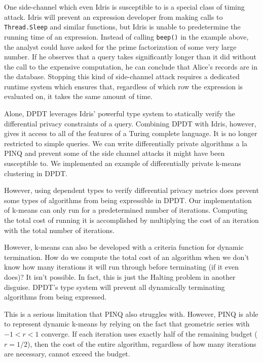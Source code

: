 \documentclass[12pt]{report}
\begin{document}
One side-channel which even Idris is susceptible to is a special class of timing attack.
Idris will prevent an expression developer from making calls to \texttt{Thread.Sleep} and similar functions, but Idris is unable to predetermine the running time of an expression.
Instead of calling \texttt{beep()} in the example above, the analyst could have asked for the prime factorization of some very large number.
If he observes that a query takes significantly longer than it did without the call to the expensive computation, he can conclude that Alice's records are in the database.
Stopping this kind of side-channel attack requires a dedicated runtime system which ensures that, regardless of which row the expression is evaluated on, it takes the same amount of time\cite{conf/uss/HaeberlenPN11}.

Alone, DPDT leverages Idris' powerful type system to statically verify the differential privacy constraints of a query.
Combining DPDT with Idris, however, gives it access to all of the features of a Turing complete language.
It is no longer restricted to simple queries.
We can write differentially private algorithms a la PINQ and prevent some of the side channel attacks it might have been susceptible to.
We implemented an example of differentially private k-means clustering in DPDT.

However, using dependent types to verify differential privacy metrics does prevent some types of algorithms from being expressible in DPDT.
Our implementation of k-means can only run for a predetermined number of iterations.
Computing the total cost of running it is accomplished by multiplying the cost of an iteration with the total number of iterations.

However, k-means can also be developed with a criteria function for dynamic termination.
How do we compute the total cost of an algorithm when we don't know how many iterations it will run through before terminating (if it even does)?
It isn't possible.
In fact, this is just the Halting problem in another disguise.
DPDT's type system will prevent all dynamically terminating algorithms from being expressed.

This is a serious limitation that PINQ also struggles with.
However, PINQ is able to represent dynamic k-means by relying on the fact that geometric series with $-1 < r < 1$ converge.
If each iteration uses exactly half of the remaining budget ($r=1/2$), then the cost of the entire algorithm, regardless of how many iterations are necessary, cannot exceed the budget.
\end{document}
